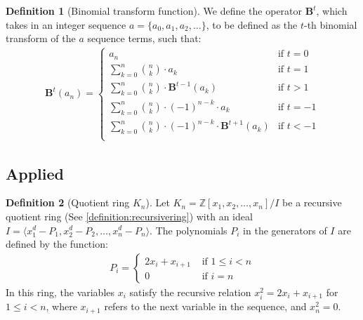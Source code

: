 \documentclass{article}
\theoremstyle{plain}
\theoremstyle{definition}
\newtheorem{definition}{Definition}
\newcommand{\Z}{\mathbb{Z}}
\newcommand{\K}{K}
\newcommand{\BT}{\textbf{B}}
\begin{document}
\begin{definition}[Binomial transform function] \label{definition:binomialtransforms}
We define the operator $\BT^t$, which takes in an integer sequence $a = \{ a_0, a_1, a_2, \ldots \}$, to be defined as the $t$-th binomial transform of the $a$ sequence terms, such that:
\begin{align*}
    \BT^{t}(a_n) =
    \begin{cases}
        a_n &\text{if } t = 0 \\
        \sum_{k=0}^{n} \binom{n}{k} \cdot a_k &\text{if } t = 1 \\
        \sum_{k=0}^{n} \binom{n}{k} \cdot \BT^{t-1}(a_k) &\text{if } t > 1 \\
        \sum_{k=0}^{n} \binom{n}{k} \cdot (-1)^{n-k} \cdot a_k  &\text{if } t = -1 \\
        \sum_{k=0}^{n} \binom{n}{k} \cdot (-1)^{n-k} \cdot \BT^{t+1}(a_k) &\text{if } t < -1 \\
    \end{cases}
\end{align*}
\end{definition}

\subsection{Applied}

\begin{definition}[Quotient ring $\K_n$] \label{definition:ring}
Let $\K_n = \Z[x_1, x_2, \ldots, x_n]/I$ be a recursive quotient ring (See \cref{definition:recursivering}) with an ideal \( I = \langle x_1^d - P_1, x_2^d - P_2, \ldots, x_n^d - P_n \rangle \). The polynomials $P_i$ in the generators of $I$ are defined by the function: 
\begin{align}
P_i =
\begin{cases}
    2x_i + x_{i+1} & \text{ if } 1 \leq i < n \\
    0 &\text{ if } i = n
\end{cases}
\end{align}
In this ring, the variables $x_i$ satisfy the recursive relation $x_i^2 = 2x_i + x_{i+1}$ for $1 \leq i < n$, where $x_{i+1}$ refers to the next variable in the sequence, and $x_n^2 = 0$.
\end{definition}
\end{document}
